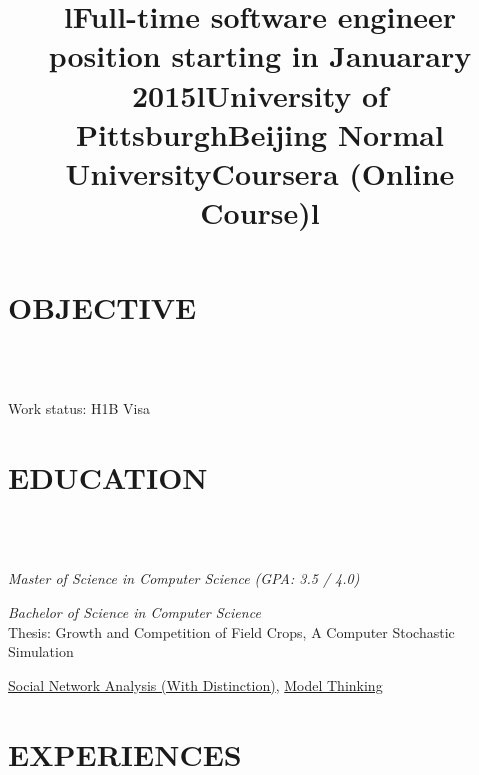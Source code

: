 \begin{resume}

\section{\textsc{OBJECTIVE}}
\begin{formatb}
	\title{l}\\
	\body\\
\end{formatb}

\employer{}
\title{\textbf{Full-time software engineer position starting in Januarary 2015}}
\begin{position}
	Work status: H1B Visa
\end{position}


\section{\textsc{EDUCATION}}
\begin{formatb}
  \title{l}\\
   \body\\
\end{formatb}

\title{\textbf{University of Pittsburgh}}
\begin{position}
	{\sl Master of Science in Computer Science (GPA: 3.5 / 4.0)}
\end{position}

\title{\textbf{Beijing Normal University}}
\begin{position}
 	{\sl Bachelor of Science in Computer Science}\\
    Thesis: Growth and Competition of Field Crops, A Computer Stochastic Simulation
\end{position}

\title{\textbf{Coursera (Online Course)}}
\begin{position}
    \href{http://qiaozhang-wordpress.stor.sinaapp.com/uploads/2012/11/SNAcertificate.pdf}{Social Network Analysis (With Distinction)}, \href{http://qiaozhang-wordpress.stor.sinaapp.com/uploads/2012/09/ModelCert.pdf}{Model Thinking}
\end{position}



\section{\textsc{EXPERIENCES}}
\begin{formatb}
	\title{l}\\
	\\
	\body\\
\end{formatb}



\end{resume}
